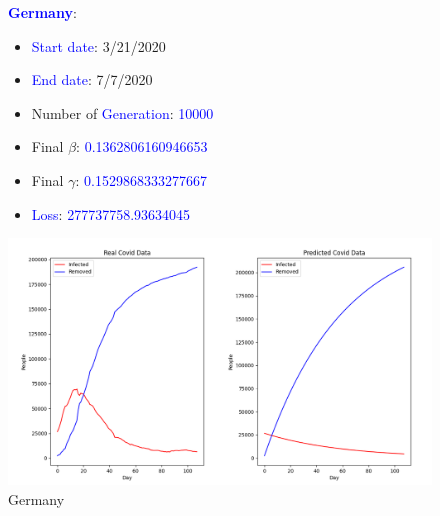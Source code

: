 \documentclass[a4paper]{article}
\begin{document}
    \begin{figure}[ht]
    \centering
    \textbf{\textcolor{blue}{Germany}}: 
    \begin{itemize}
        \item \textcolor{blue}{Start date}: 3/21/2020
        \item \textcolor{blue}{End date}: 7/7/2020
        \item Number of \textcolor{blue}{Generation}: \textcolor{blue}{10000}
        \item Final $\beta$: \textcolor{blue}{0.1362806160946653}
        \item Final $\gamma$: \textcolor{blue}{0.1529868333277667}
        \item \textcolor{blue}{Loss}: \textcolor{blue}{277737758.93634045}
    \end{itemize}
    
    \includegraphics[width= \linewidth]{ex5-plot/Germany.png}
    
    \caption{Germany}
    \end{figure}
\end{document}
